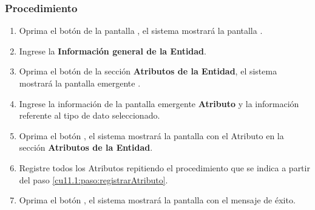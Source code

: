 \subsubsection{Procedimiento}
\begin{enumerate}
	\item Oprima el botón  de la pantalla , el sistema mostrará la pantalla . 

	
	\item Ingrese la \textbf{Información general de la Entidad}.
	
	\item Oprima el botón  de la sección \textbf{Atributos de la Entidad}, el sistema mostrará la pantalla emergente . \label{cu11.1:paso:registrarAtributo} 


	\item Ingrese la información de la pantalla emergente \textbf{Atributo} y la información referente al tipo de dato seleccionado.
	
	\item Oprima el botón , el sistema mostrará la pantalla  con el Atributo en la sección \textbf{Atributos de la Entidad}.
	
	\item Registre todos los Atributos repitiendo el procedimiento que se indica a partir del paso \ref{cu11.1:paso:registrarAtributo}.
	
	\item Oprima el botón , el sistema mostrará la pantalla  con el mensaje de éxito.
\end{enumerate}


